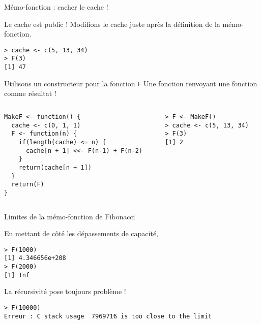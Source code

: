 \documentclass[10pt]{beamer}
\begin{document}
\begin{frame}[fragile]{Mémo-fonction : cacher le cache !}
  \begin{block}{Le cache est public !}
    Modifions le cache juste après la définition de la mémo-fonction.
\begin{lstlisting}
> cache <- c(5, 13, 34)
> F(3)
[1] 47
\end{lstlisting}
\end{block}
\begin{block}{Utilisons un constructeur pour la fonction \texttt{F}}
  Une fonction renvoyant une fonction comme résultat !

\begin{columns}[t]
\begin{column}{0.55\textwidth}
\begin{lstlisting}[style=editor]
MakeF <- function() {
  cache <- c(0, 1, 1)
  F <- function(n) {
    if(length(cache) <= n) {
      cache[n + 1] <<- F(n-1) + F(n-2)
    }
    return(cache[n + 1])
  }
  return(F)
}
  \end{lstlisting}
\end{column}
\begin{column}{0.45\textwidth}
  \begin{lstlisting}
> F <- MakeF()
> cache <- c(5, 13, 34)
> F(3)
[1] 2
  \end{lstlisting}
\end{column}
\end{columns}
\end{block}
\end{frame}


\begin{frame}[fragile]{Limites de la mémo-fonction de Fibonacci}

  \begin{exampleblock}{En mettant de côté les dépassements de capacité,}
    \begin{lstlisting}[style=block]
> F(1000)
[1] 4.346656e+208
> F(2000)
[1] Inf
\end{lstlisting}
\end{exampleblock}

\begin{alertblock}{La récursivité pose toujours problème !}
    \begin{lstlisting}[style=block]
> F(10000)
Erreur : C stack usage  7969716 is too close to the limit
    \end{lstlisting}
  \end{alertblock}
\end{frame}
\end{document}
